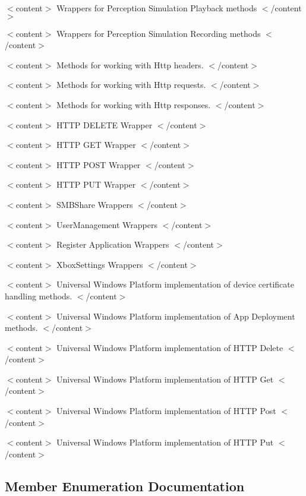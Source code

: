 $<$content$>$ Wrappers for Perception Simulation Playback methods $<$/content$>$

$<$content$>$ Wrappers for Perception Simulation Recording methods $<$/content$>$

$<$content$>$ Methods for working with Http headers. $<$/content$>$

$<$content$>$ Methods for working with Http requests. $<$/content$>$

$<$content$>$ Methods for working with Http responses. $<$/content$>$

$<$content$>$ H\+T\+TP D\+E\+L\+E\+TE Wrapper $<$/content$>$

$<$content$>$ H\+T\+TP G\+ET Wrapper $<$/content$>$

$<$content$>$ H\+T\+TP P\+O\+ST Wrapper $<$/content$>$

$<$content$>$ H\+T\+TP P\+UT Wrapper $<$/content$>$

$<$content$>$ S\+M\+B\+Share Wrappers $<$/content$>$

$<$content$>$ User\+Management Wrappers $<$/content$>$

$<$content$>$ Register Application Wrappers $<$/content$>$

$<$content$>$ Xbox\+Settings Wrappers $<$/content$>$

$<$content$>$ Universal Windows Platform implementation of device certificate handling methods. $<$/content$>$

$<$content$>$ Universal Windows Platform implementation of App Deployment methods. $<$/content$>$

$<$content$>$ Universal Windows Platform implementation of H\+T\+TP Delete $<$/content$>$

$<$content$>$ Universal Windows Platform implementation of H\+T\+TP Get $<$/content$>$

$<$content$>$ Universal Windows Platform implementation of H\+T\+TP Post $<$/content$>$

$<$content$>$ Universal Windows Platform implementation of H\+T\+TP Put $<$/content$>$ 

\subsection{Member Enumeration Documentation}
